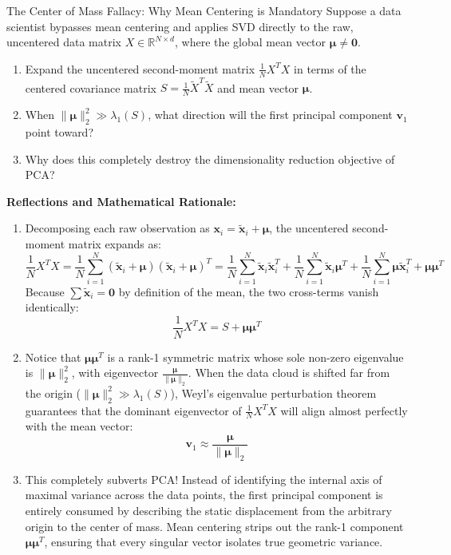 \begin{ponderbox}{The Center of Mass Fallacy: Why Mean Centering is Mandatory}
Suppose a data scientist bypasses mean centering and applies SVD directly to the raw, uncentered data matrix $X \in \mathbb{R}^{N \times d}$, where the global mean vector $\boldsymbol{\mu} \ne \mathbf{0}$.
\begin{enumerate}
    \item Expand the uncentered second-moment matrix $\frac{1}{N} X^T X$ in terms of the centered covariance matrix $S = \frac{1}{N}\tilde{X}^T \tilde{X}$ and mean vector $\boldsymbol{\mu}$.
    \item When $\|\boldsymbol{\mu}\|_2^2 \gg \lambda_1(S)$, what direction will the first principal component $\mathbf{v}_1$ point toward?
    \item Why does this completely destroy the dimensionality reduction objective of PCA?
\end{enumerate}
\tcblower
\textbf{Reflections and Mathematical Rationale:}
\begin{enumerate}
    \item Decomposing each raw observation as $\mathbf{x}_i = \tilde{\mathbf{x}}_i + \boldsymbol{\mu}$, the uncentered second-moment matrix expands as:
    \begin{equation*}
    \frac{1}{N} X^T X = \frac{1}{N}\sum_{i=1}^N (\tilde{\mathbf{x}}_i + \boldsymbol{\mu})(\tilde{\mathbf{x}}_i + \boldsymbol{\mu})^T = \frac{1}{N}\sum_{i=1}^N \tilde{\mathbf{x}}_i \tilde{\mathbf{x}}_i^T + \frac{1}{N}\sum_{i=1}^N \tilde{\mathbf{x}}_i \boldsymbol{\mu}^T + \frac{1}{N}\sum_{i=1}^N \boldsymbol{\mu}\tilde{\mathbf{x}}_i^T + \boldsymbol{\mu}\boldsymbol{\mu}^T
    \end{equation*}
    Because $\sum \tilde{\mathbf{x}}_i = \mathbf{0}$ by definition of the mean, the two cross-terms vanish identically:
    \begin{equation*}
    \frac{1}{N} X^T X = S + \boldsymbol{\mu}\boldsymbol{\mu}^T
    \end{equation*}
    \item Notice that $\boldsymbol{\mu}\boldsymbol{\mu}^T$ is a rank-1 symmetric matrix whose sole non-zero eigenvalue is $\|\boldsymbol{\mu}\|_2^2$, with eigenvector $\frac{\boldsymbol{\mu}}{\|\boldsymbol{\mu}\|_2}$. When the data cloud is shifted far from the origin ($\|\boldsymbol{\mu}\|_2^2 \gg \lambda_1(S)$), Weyl's eigenvalue perturbation theorem guarantees that the dominant eigenvector of $\frac{1}{N}X^T X$ will align almost perfectly with the mean vector:
    \begin{equation*}
    \mathbf{v}_1 \approx \frac{\boldsymbol{\mu}}{\|\boldsymbol{\mu}\|_2}
    \end{equation*}
    \item This completely subverts PCA! Instead of identifying the internal axis of maximal variance across the data points, the first principal component is entirely consumed by describing the static displacement from the arbitrary origin to the center of mass. Mean centering strips out the rank-1 component $\boldsymbol{\mu}\boldsymbol{\mu}^T$, ensuring that every singular vector isolates true geometric variance.
\end{enumerate}
\end{ponderbox}

